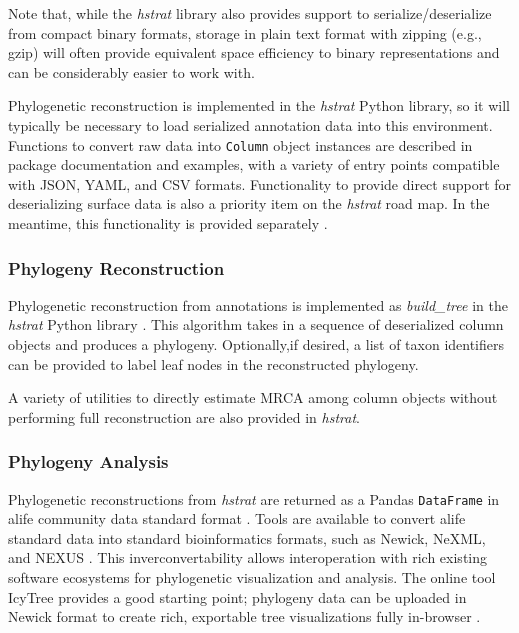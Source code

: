 Note that, while the \textit{hstrat} library also provides support to serialize/deserialize from compact binary formats, storage in plain text format with zipping (e.g., gzip) will often provide equivalent space efficiency to binary representations and can be considerably easier to work with.

Phylogenetic reconstruction is implemented in the \textit{hstrat} Python library, so it will typically be necessary to load serialized annotation data into this environment.
Functions to convert raw data into \texttt{Column} object instances are described in package documentation and examples, with a variety of entry points compatible with JSON, YAML, and CSV formats.
Functionality to provide direct support for deserializing surface data is also a priority item on the \textit{hstrat} road map.
In the meantime, this functionality is provided separately \citep{moreno2024hsurf}.

\subsubsection{Phylogeny Reconstruction}

Phylogenetic reconstruction from annotations is implemented as \textit{build\_tree} in the \textit{hstrat} Python library \citep{moreno2022hstrat}.
This algorithm takes in a sequence of deserialized column objects and produces a phylogeny.
Optionally,if desired, a list of taxon identifiers can be provided to label leaf nodes in the reconstructed phylogeny.

A variety of utilities to directly estimate MRCA among column objects without performing full reconstruction are also provided in \textit{hstrat}.

\subsubsection{Phylogeny Analysis}

Phylogenetic reconstructions from \textit{hstrat} are returned as a Pandas \texttt{DataFrame} in alife community data standard format \citep{lalejini2019data,reback2020pandas}.
Tools are available to convert alife standard data into standard bioinformatics formats, such as Newick, NeXML, and NEXUS \citep{moreno2024apc}.
This inverconvertability allows interoperation with rich existing software ecosystems for phylogenetic visualization and analysis.
The online tool IcyTree provides a good starting point; phylogeny data can be uploaded in Newick format to create rich, exportable tree visualizations fully in-browser \citep{vaughan2017icytree}.

